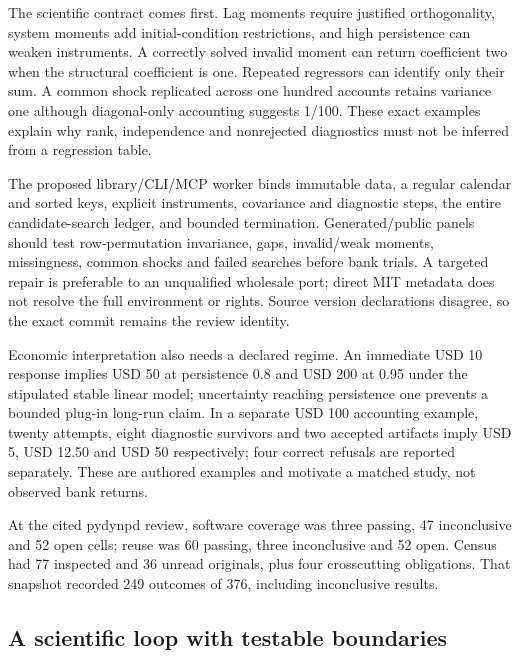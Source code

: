 The scientific contract comes first. Lag moments require justified
orthogonality, system moments add initial-condition restrictions, and
high persistence can weaken instruments. A correctly solved invalid
moment can return coefficient two when the structural coefficient is
one. Repeated regressors can identify only their sum. A common shock
replicated across one hundred accounts retains variance one although
diagonal-only accounting suggests 1/100. These exact examples explain
why rank, independence and nonrejected diagnostics must not be inferred
from a regression table.
\citep{arellano1991,blundellbond2023,exec24_pydynpd_reference}

The proposed library/CLI/MCP worker binds immutable data, a regular
calendar and sorted keys, explicit instruments, covariance and
diagnostic steps, the entire candidate-search ledger, and bounded
termination. Generated/public panels should test row-permutation
invariance, gaps, invalid/weak moments, missingness, common shocks and
failed searches before bank trials. A targeted repair is preferable to
an unqualified wholesale port; direct MIT metadata does not resolve the
full environment or rights. Source version declarations disagree, so the
exact commit remains the review identity. \citep{exec24_pydynpd_source}

Economic interpretation also needs a declared regime. An immediate USD
10 response implies USD 50 at persistence 0.8 and USD 200 at 0.95 under
the stipulated stable linear model; uncertainty reaching persistence one
prevents a bounded plug-in long-run claim. In a separate USD 100
accounting example, twenty attempts, eight diagnostic survivors and two
accepted artifacts imply USD 5, USD 12.50 and USD 50 respectively; four
correct refusals are reported separately. These are authored examples
and motivate a matched study, not observed bank returns.
\citep{exec24_pydynpd_reference}

At the cited pydynpd review, software coverage was three passing, 47
inconclusive and 52 open cells; reuse was 60 passing, three inconclusive
and 52 open. Census had 77 inspected and 36 unread originals, plus four
crosscutting obligations. That snapshot recorded 249 outcomes of 376,
including inconclusive results.
\citep{sp24pydynpd_reader,sp24pydynpd_progress}

\hypertarget{a-scientific-loop-with-testable-boundaries}{%
\subsection{A scientific loop with testable
boundaries}\label{a-scientific-loop-with-testable-boundaries}}

